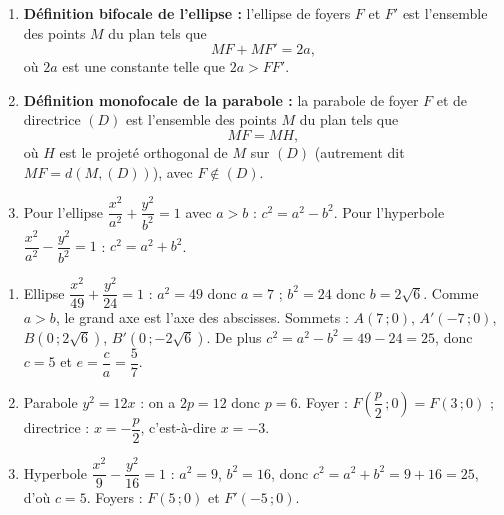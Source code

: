 \documentclass[11pt]{article}
\begin{document}
\begin{corrige}
\begin{enumerate}
\item \textbf{Définition bifocale de l'ellipse :} l'ellipse de foyers $F$ et $F'$ est l'ensemble des points $M$ du plan tels que
\[ MF+MF'=2a, \]
où $2a$ est une constante telle que $2a>FF'$.
\item \textbf{Définition monofocale de la parabole :} la parabole de foyer $F$ et de directrice $(D)$ est l'ensemble des points $M$ du plan tels que
\[ MF=MH, \]
où $H$ est le projeté orthogonal de $M$ sur $(D)$ (autrement dit $MF=d(M,(D))$), avec $F\notin(D)$.
\item Pour l'ellipse $\dfrac{x^{2}}{a^{2}}+\dfrac{y^{2}}{b^{2}}=1$ avec $a>b$ : $c^{2}=a^{2}-b^{2}$. Pour l'hyperbole $\dfrac{x^{2}}{a^{2}}-\dfrac{y^{2}}{b^{2}}=1$ : $c^{2}=a^{2}+b^{2}$.
\end{enumerate}
\end{corrige}

\begin{corrige}
\begin{enumerate}
\item Ellipse $\dfrac{x^{2}}{49}+\dfrac{y^{2}}{24}=1$ : $a^{2}=49$ donc $a=7$ ; $b^{2}=24$ donc $b=2\sqrt{6}$. Comme $a>b$, le grand axe est l'axe des abscisses. Sommets : $A(7\,;0)$, $A'(-7\,;0)$, $B(0\,;2\sqrt{6})$, $B'(0\,;-2\sqrt{6})$. De plus $c^{2}=a^{2}-b^{2}=49-24=25$, donc $c=5$ et $e=\dfrac{c}{a}=\dfrac{5}{7}$.
\item Parabole $y^{2}=12x$ : on a $2p=12$ donc $p=6$. Foyer : $F\left(\dfrac{p}{2}\,;0\right)=F(3\,;0)$ ; directrice : $x=-\dfrac{p}{2}$, c'est-à-dire $x=-3$.
\item Hyperbole $\dfrac{x^{2}}{9}-\dfrac{y^{2}}{16}=1$ : $a^{2}=9$, $b^{2}=16$, donc $c^{2}=a^{2}+b^{2}=9+16=25$, d'où $c=5$. Foyers : $F(5\,;0)$ et $F'(-5\,;0)$.
\end{enumerate}
\end{corrige}
\end{document}
